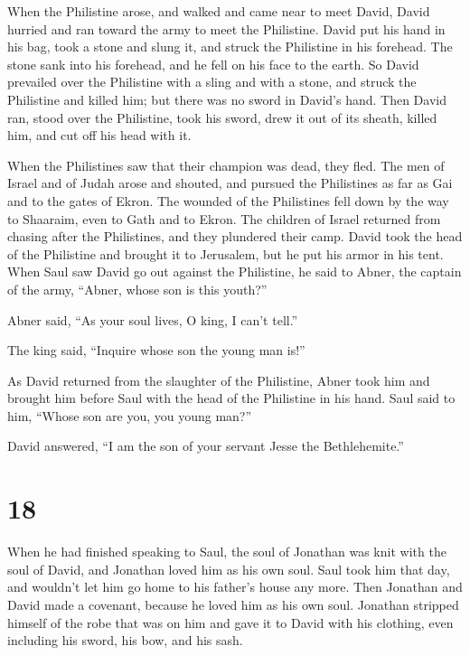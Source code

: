  When the Philistine arose, and walked and came near to
meet David, David hurried and ran toward the army to meet the
Philistine.  David put his hand in his bag, took a stone
and slung it, and struck the Philistine in his forehead. The stone sank
into his forehead, and he fell on his face to the earth. 
So David prevailed over the Philistine with a sling and with a stone,
and struck the Philistine and killed him; but there was no sword in
David's hand.  Then David ran, stood over the Philistine,
took his sword, drew it out of its sheath, killed him, and cut off his
head with it.

When the Philistines saw that their champion was dead, they fled.
 The men of Israel and of Judah arose and shouted, and
pursued the Philistines as far as Gai and to the gates of Ekron. The
wounded of the Philistines fell down by the way to Shaaraim, even to
Gath and to Ekron.  The children of Israel returned from
chasing after the Philistines, and they plundered their camp.
 David took the head of the Philistine and brought it to
Jerusalem, but he put his armor in his tent.  When Saul
saw David go out against the Philistine, he said to Abner, the captain
of the army, ``Abner, whose son is this youth?''

Abner said, ``As your soul lives, O king, I can't tell.''

 The king said, ``Inquire whose son the young man is!''

 As David returned from the slaughter of the Philistine,
Abner took him and brought him before Saul with the head of the
Philistine in his hand.  Saul said to him, ``Whose son
are you, you young man?''

David answered, ``I am the son of your servant Jesse the Bethlehemite.''

\hypertarget{section-17}{%
\section{18}\label{section-17}}

 When he had finished speaking to Saul, the soul of
Jonathan was knit with the soul of David, and Jonathan loved him as his
own soul.  Saul took him that day, and wouldn't let him go
home to his father's house any more.  Then Jonathan and
David made a covenant, because he loved him as his own soul.
 Jonathan stripped himself of the robe that was on him and
gave it to David with his clothing, even including his sword, his bow,
and his sash.

